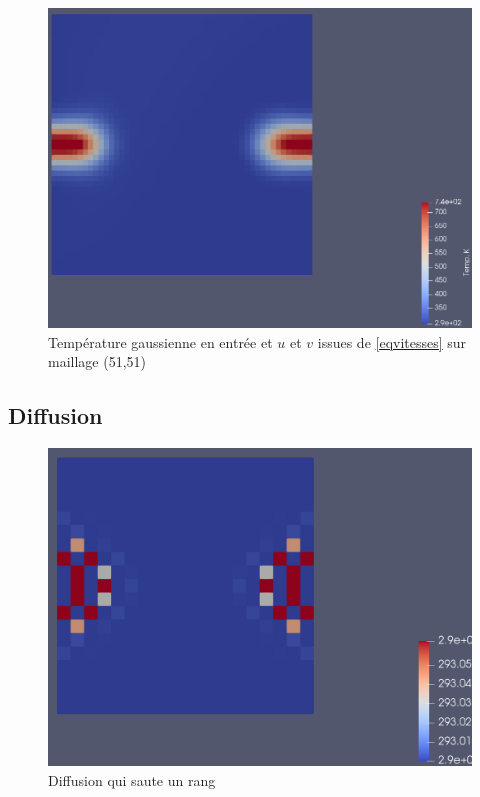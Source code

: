 \documentclass[a4paper,oneside]{article}
\makeatletter
\def\bigcenter{\trivlist \bigcentering\item\relax}
\def\bigcentering{\let\\\@centercr\rightskip\@bigflushglue%
\leftskip\@bigflushglue
\parindent\z@\parfillskip\z@skip}
\makeatother
\begin{document}
\begin{figure}[h!]
\centering
\includegraphics[scale=0.3]{Advection_2D/TemperatureGaussienne.png}
\caption{Température gaussienne en entrée et $u$ et $v$ issues de \ref{eqvitesses} sur maillage (51,51)}
\end{figure}

\subsection{Diffusion}

\begin{figure}[h!]
\bigcenter
\includegraphics[scale=0.4]{Diffusion/Diffusion_saute.png}
\caption{Diffusion qui saute un rang}
\end{figure}
\end{document}
